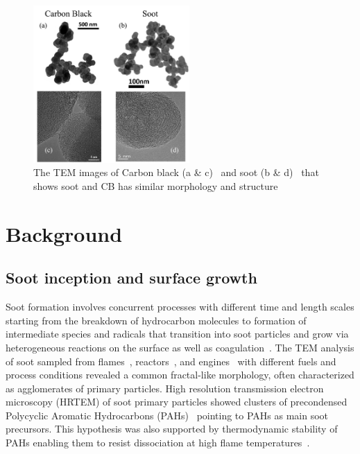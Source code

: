 \begin{figure}[!htbp]
	\centering
	\includegraphics[height=60mm, ]{Figures/Introduction/soot_CB_HRTEM.jpg}
	\caption{The TEM images of Carbon black (a \& c)~\citep{singh2018nanostructure} and soot (b \& d)~\citep{vander2007hrtem, lapuerta2017morphological}
	\label{fig:sootCBHRTEM} that shows soot and CB has similar morphology and structure}
\end{figure} 



\section{Background}
\subsection{Soot inception and surface growth}
Soot formation involves concurrent processes with different time and length scales starting from the breakdown of hydrocarbon molecules to formation of intermediate species and radicals that transition into soot particles and grow via heterogeneous reactions on the surface as well as coagulation~\citep{d2009combustion}. The TEM analysis of soot sampled from flames~\citep{lapuerta2017morphological}, reactors~\citep{ono2017experimental}, and engines~\citep{wei2020morphology} with different fuels and process conditions revealed a common fractal-like morphology, often characterized as agglomerates of primary particles. High resolution transmission electron microscopy (HRTEM) of soot primary particles showed clusters of precondensed Polycyclic Aromatic Hydrocarbons (PAHs)~\cite{alfe2009structure} pointing to PAHs as main soot precursors. This hypothesis was also supported by thermodynamic stability of PAHs enabling them to resist dissociation at high flame temperatures~\cite{stein1985high}. 

